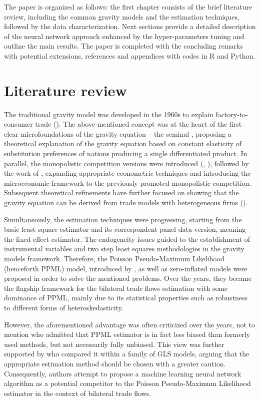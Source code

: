 \documentclass{Trade_template}
\numberwithin{equation}{section}
\begin{document}
The paper is organized as follows: the first chapter consists of the brief literature review, including the common gravity models and the estimation techniques, followed by the data characterization. Next sections provide a detailed description of the neural network approach enhanced by the hyper-parameters tuning and outline the main results. The paper is completed with the concluding remarks with potential extensions, references and appendices with codes in R and Python.

\chapter{Literature review}

The traditional gravity model was developed in the 1960s to explain factory-to-consumer trade (\citet{tinbergen1962analysis}). The above-mentioned concept was at the heart of the first clear microfoundations of the gravity equation – the seminal \citet{anderson1979theoretical}, proposing a theoretical explanation of the gravity equation based on constant elasticity of substitution preferences of nations producing a single differentiated product. In parallel, the monopolistic competition versions were introduced (\citet{krugman1980scale}, \citet{bergstrand1985gravity}), followed by the work of \citet{anderson2003gravity}, expanding appropriate econometric techniques and introducing the microeconomic framework to the previously promoted monopolistic competition. Subsequent theoretical refinements have further focused on showing that the gravity equation can be derived from trade models with heterogeneous firms (\citet{helpman2008estimating}).

Simultaneously, the estimation techniques were progressing, starting from the basic least square estimator and its correspondent panel data version, meaning the fixed effect estimator. The endogeneity issues guided to the establishment of instrumental variables and two step least squares methodologies in the gravity models framework. Therefore, the Poisson Pseudo-Maximum Likelihood (henceforth PPML) model, introduced by \citet{santos2006ppml}, as well as zero-inflated models were proposed in order to solve the mentioned problems. Over the years, they became the flagship framework for the bilateral trade flows estimation with some dominance of PPML, mainly due to its statistical properties such as robustness to different forms of heteroskedasticity.

However, the aforementioned advantage was often criticized over the years, not to mention \citet{martin2008gravity} who admitted that PPML estimator is in fact less biased than formerly used methods, but not necessarily fully unbiased. This view was further supported by \citet{martinez2013gravity} who compared it within a family of GLS models, arguing that the appropriate estimation method should be chosen with a greater caution. Consequently, authors attempt to propose a machine learning neural network algorithm as a potential competitor to the Poisson Pseudo-Maximum Likelihood estimator in the context of bilateral trade flows.
\end{document}
